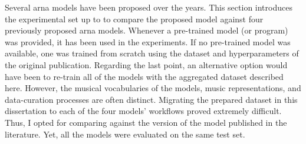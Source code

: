 
Several \gls{arna} models have been proposed over the years.
This section introduces the experimental set up to to
compare the proposed model against four previously proposed
\gls{arna} models. Whenever a pre-trained model (or program)
was provided, it has been used in the experiments. If no
pre-trained model was available, one was trained from
scratch using the dataset and hyperparameters of the
original publication. Regarding the last point, an
alternative option would have been to re-train all of the
models with the aggregated dataset described here. However,
the musical vocabularies of the models, music
representations, and data-curation processes are often
distinct. Migrating the prepared dataset in this
dissertation to each of the four models' workflows proved
extremely difficult. Thus, I opted for comparing against the
version of the model published in the literature. Yet, all
the models were evaluated on the same test set.
